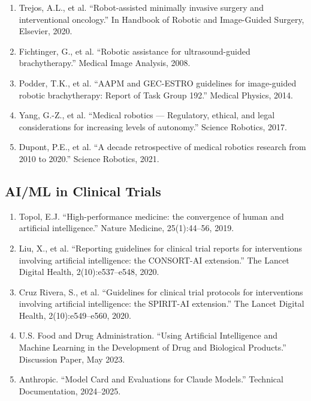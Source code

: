 \begin{enumerate}[resume]
\item Trejos, A.L., et al. ``Robot-assisted minimally invasive surgery and interventional oncology.'' In Handbook of Robotic and Image-Guided Surgery, Elsevier, 2020.

\item Fichtinger, G., et al. ``Robotic assistance for ultrasound-guided brachytherapy.'' Medical Image Analysis, 2008.

\item Podder, T.K., et al. ``AAPM and GEC-ESTRO guidelines for image-guided robotic brachytherapy: Report of Task Group 192.'' Medical Physics, 2014.

\item Yang, G.-Z., et al. ``Medical robotics --- Regulatory, ethical, and legal considerations for increasing levels of autonomy.'' Science Robotics, 2017.

\item Dupont, P.E., et al. ``A decade retrospective of medical robotics research from 2010 to 2020.'' Science Robotics, 2021.
\end{enumerate}

\subsection*{AI/ML in Clinical Trials}

\begin{enumerate}[resume]
\item Topol, E.J. ``High-performance medicine: the convergence of human and artificial intelligence.'' Nature Medicine, 25(1):44--56, 2019.

\item Liu, X., et al. ``Reporting guidelines for clinical trial reports for interventions involving artificial intelligence: the CONSORT-AI extension.'' The Lancet Digital Health, 2(10):e537--e548, 2020.

\item Cruz Rivera, S., et al. ``Guidelines for clinical trial protocols for interventions involving artificial intelligence: the SPIRIT-AI extension.'' The Lancet Digital Health, 2(10):e549--e560, 2020.

\item U.S. Food and Drug Administration. ``Using Artificial Intelligence and Machine Learning in the Development of Drug and Biological Products.'' Discussion Paper, May 2023.

\item Anthropic. ``Model Card and Evaluations for Claude Models.'' Technical Documentation, 2024--2025.
\end{enumerate}

